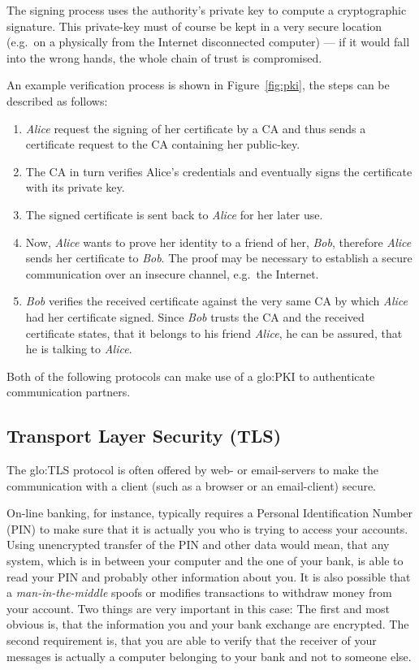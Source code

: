 The  signing  process  uses  the  authority's private  key  to  compute  a
cryptographic signature. This private-key must of course be kept in a very
secure  location  (e.g.~on a  physically  from  the Internet  disconnected
computer) ---  if it would fall into  the wrong hands, the  whole chain of
trust is compromised.

An  example verification  process  is shown  in Figure~\ref{fig:pki},  the
steps can be described as follows:
\begin{enumerate}
\item \emph{Alice} request the signing of her certificate by a CA and thus
  sends a certificate request to the CA containing her public-key.
\item The CA in turn verifies Alice's credentials and eventually signs the
  certificate with its private key.
\item The signed certificate is sent back to \emph{Alice} for her later use.
\item Now,  \emph{Alice} wants to prove  her identity to a  friend of her,
  \emph{Bob},   therefore   \emph{Alice}    sends   her   certificate   to
  \emph{Bob}.  The   proof  may  be   necessary  to  establish   a  secure
  communication over an insecure channel, e.g.~the Internet.
\item \emph{Bob}  verifies the received certificate against  the very same
  CA by  which \emph{Alice} had her certificate  signed.  Since \emph{Bob}
  trusts the  CA and the received  certificate states, that  it belongs to
  his  friend \emph{Alice},  he  can be  assured,  that he  is talking  to
  \emph{Alice}.
\end{enumerate}

\bigskip

Both  of  the following  protocols  can make  use  of  a \gls{glo:PKI}  to
authenticate communication partners.

\subsection[Transport Layer Security]{Transport Layer Security (TLS)}

The \gls{glo:TLS}  protocol is often  offered by web- or  email-servers to
make  the  communication   with  a  client  (such  as   a  browser  or  an
email-client) secure.

On-line   banking,   for   instance,   typically   requires   a   Personal
Identification Number  (PIN) to make sure  that it is actually  you who is
trying to access your accounts.  Using unencrypted transfer of the PIN and
other data would mean, that any  system, which is in between your computer
and the  one of your  bank, is  able to read  your PIN and  probably other
information about you. It is also possible that a \emph{man-in-the-middle}
spoofs or modifies  transactions to withdraw money from  your account. Two
things are  very important in  this case: The  first and most  obvious is,
that the information you and  your bank exchange are encrypted. The second
requirement is,  that you  are able  to verify that  the receiver  of your
messages is actually a computer belonging  to your bank and not to someone
else.

